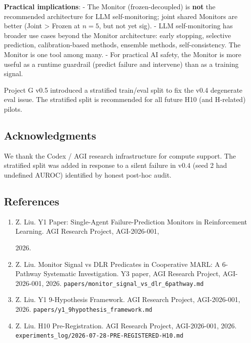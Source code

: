 \documentclass[
]{article}
\providecommand{\tightlist}{%
  \setlength{\itemsep}{0pt}\setlength{\parskip}{0pt}}
\begin{document}
\textbf{Practical implications}: - The Monitor (frozen-decoupled) is
\textbf{not} the recommended architecture for LLM self-monitoring; joint
shared Monitors are better (Joint \textgreater{} Frozen at \(n=5\), but
not yet sig). - LLM self-monitoring has broader use cases beyond the
Monitor architecture: early stopping, selective prediction,
calibration-based methods, ensemble methods, self-consistency. The
Monitor is one tool among many. - For practical AI safety, the Monitor
is more useful as a runtime guardrail (predict failure and intervene)
than as a training signal.

Project G v0.5 introduced a stratified train/eval split to fix the v0.4
degenerate eval issue. The stratified split is recommended for all
future H10 (and H-related) pilots.

\subsection{Acknowledgments}\label{acknowledgments}

We thank the Codex / AGI research infrastructure for compute support.
The stratified split was added in response to a silent failure in v0.4
(seed 2 had undefined AUROC) identified by honest post-hoc audit.

\subsection{References}\label{references}

\begin{enumerate}
\def\labelenumi{\arabic{enumi}.}
\tightlist
\item
  Z. Liu. Y1 Paper: Single-Agent Failure-Prediction Monitors in
  Reinforcement Learning. AGI Research Project, AGI-2026-001,

  2026.
\item
  Z. Liu. Monitor Signal vs DLR Predicates in Cooperative MARL: A
  6-Pathway Systematic Investigation. Y3 paper, AGI Research Project,
  AGI-2026-001, 2026.
  \texttt{papers/monitor\_signal\_vs\_dlr\_6pathway.md}
\item
  Z. Liu. Y1 9-Hypothesis Framework. AGI Research Project, AGI-2026-001,
  2026. \texttt{papers/y1\_9hypothesis\_framework.md}
\item
  Z. Liu. H10 Pre-Registration. AGI Research Project, AGI-2026-001,
  2026. \texttt{experiments\_log/2026-07-28-PRE-REGISTERED-H10.md}
\end{enumerate}
\end{document}
